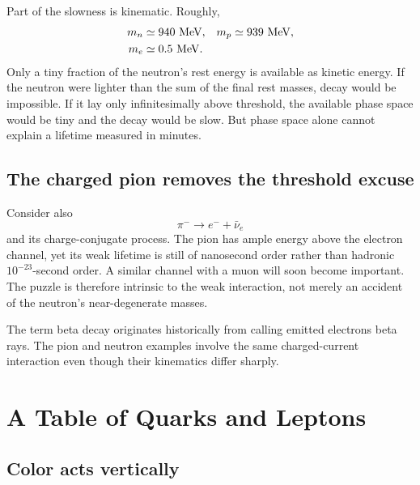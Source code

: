 Part of the slowness is kinematic. Roughly,
\begin{equation}
\begin{aligned}
m_n&\simeq940\ {\rm MeV},
&
m_p&\simeq939\ {\rm MeV},
\\
m_e&\simeq0.5\ {\rm MeV}.
\end{aligned}
\end{equation}
Only a tiny fraction of the neutron's rest energy is available as kinetic
energy. If the neutron were lighter than the sum of the final rest masses,
decay would be impossible. If it lay only infinitesimally above threshold, the
available phase space would be tiny and the decay would be slow. But phase
space alone cannot explain a lifetime measured in minutes.

\subsection{The charged pion removes the threshold excuse}

Consider also
\begin{equation}
\pi^-\longrightarrow e^-+\bar\nu_e
\end{equation}
and its charge-conjugate process. The pion has ample energy above the electron
channel, yet its weak lifetime is still of nanosecond order rather than
hadronic \(10^{-23}\)-second order. A similar channel with a muon will soon
become important. The puzzle is therefore intrinsic to the weak interaction,
not merely an accident of the neutron's near-degenerate masses.


The term beta decay originates historically from calling emitted electrons
beta rays. The pion and neutron examples involve the same charged-current
interaction even though their kinematics differ sharply.

\section{A Table of Quarks and Leptons}

\subsection{Color acts vertically}

